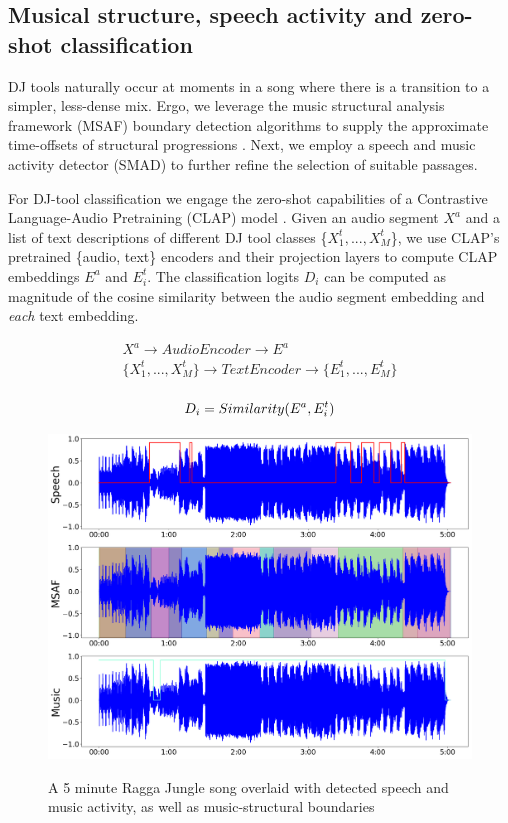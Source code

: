 \documentclass{article}
\begin{document}
\subsection{Musical structure, speech activity and zero-shot classification}\label{sec:djtool_classes}
DJ tools naturally occur at moments in a song where there is a transition to a simpler, less-dense mix. Ergo, we leverage the music structural analysis framework (MSAF) boundary detection algorithms to supply the approximate time-offsets of structural progressions \cite{nieto2016systematic}. Next, we employ a speech and music activity detector (SMAD)\cite{Hung2022} to further refine the selection of suitable passages.

For DJ-tool classification we engage the zero-shot capabilities of a Contrastive Language-Audio Pretraining (CLAP) model \cite{elizalde2022claplearningaudioconcepts}. Given an audio segment $X^{a}$ and a list of text descriptions of different DJ tool classes \{$X^{t}_{1},...,X^{t}_{M}$\}, we use CLAP's pretrained \{audio, text\} encoders and their projection layers to compute CLAP embeddings $E^a$ and $E^t_i$. The classification logits $D_i$ can be computed as magnitude of the cosine similarity between the audio segment embedding and \textit{each} text embedding.

\begin{equation}
\begin{matrix}
    X^{a} \rightarrow AudioEncoder \rightarrow E^{a} \\ 
    \{X^{t}_{1},...,X^{t}_{M}\} \rightarrow TextEncoder \rightarrow \{E^{t}_{1},...,E^{t}_{M}\} \\ 
\end{matrix}
\end{equation}

\begin{equation}
    D_i = Similarity(E^a, E^{t}_{i}) \\ 
\end{equation}


\begin{figure}
 \centerline{
 	\includegraphics[alt={SMAD \& MSAF Analysis signals},width=0.9\columnwidth]{smad_msaf.png}}
 \caption{A 5 minute Ragga Jungle song overlaid with detected speech and music activity, as well as music-structural boundaries}
 \label{fig:msafsmadplot}
\end{figure}
\end{document}
